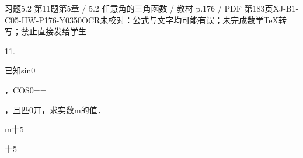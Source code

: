\begin{bankitem}{习题5.2 第11题}{第5章 / 5.2 任意角的三角函数 / 教材 p.176 / PDF 第183页}{XJ-B1-C05-HW-P176-Y0350}{OCR未校对：公式与文字均可能有误；未完成数学TeX转写；禁止直接发给学生}
\begin{ocrdraft}
\par
11.
\par
已知sin0=
\par
，COS0==
\par
，且匹0丌，求实数m的值．
\par
m十5
\par
十5
\end{ocrdraft}
\end{bankitem}
